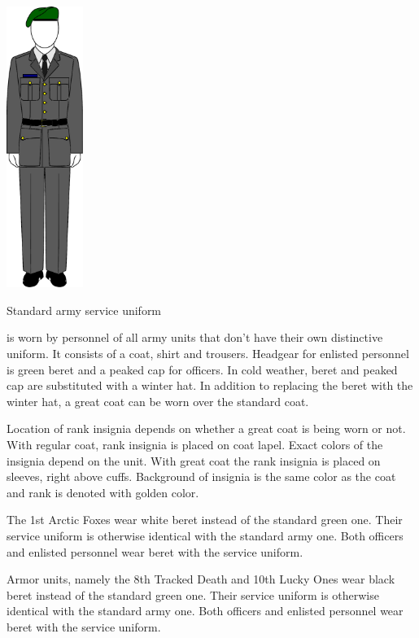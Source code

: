 \documentclass{tufte-book}
\begin{document}
\begin{marginfigure}[0\baselineskip]
  \includegraphics[width=2.5cm]{army_service}
  \caption{Standard army service uniform}
  \label{fig:army_service}
\end{marginfigure}

 is worn by personnel of all army
units that don't have their own distinctive uniform. It consists of a coat,
shirt and trousers. Headgear for enlisted personnel is green beret and
a peaked cap for officers. In cold weather, beret and peaked cap are
substituted with a winter hat. In addition to replacing the beret with 
the winter hat, a great coat can be worn over the standard coat.

Location of rank insignia depends on whether a great coat is being worn or
not. With regular coat, rank insignia is placed on coat lapel. Exact colors
of the insignia depend on the unit. With great coat the rank insignia is
placed on sleeves, right above cuffs. Background of insignia is the same color
as the coat and rank is denoted with golden color.

The 1st Arctic Foxes wear white beret instead of the standard green one. Their
service uniform is otherwise identical with the standard army one. Both
officers and enlisted personnel wear beret with the service uniform.

Armor units, namely the 8th Tracked Death and 10th Lucky Ones wear black beret
instead of the standard green one. Their service uniform is otherwise
identical with the standard army one. Both officers and enlisted personnel
wear beret with the service uniform.
\end{document}
